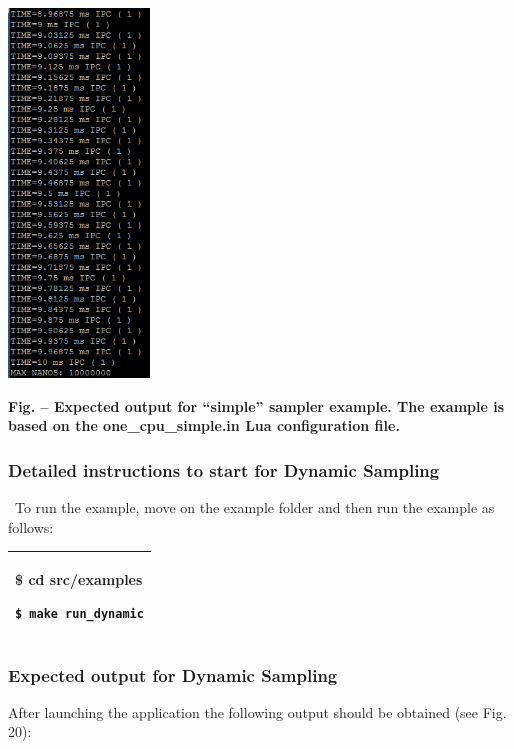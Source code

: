 \documentclass[a4paper]{article}
\newcounter{Figure}
\renewcommand\theFigure{\arabic{Figure}}
\begin{document}
{\centering 
\includegraphics[width=1.4756in,height=3.8563in]{img35.png}
\par}

{\centering{}\sffamily\bfseries
Fig.
\stepcounter{Figure}{\theFigure} -- Expected output for
{\textquotedblleft}simple{\textquotedblright} sampler example. The
example is based on the one\_cpu\_simple.in Lua configuration file.
\par}

\subsubsection[Detailed instructions to start for Dynamic
Sampling]{\textrm{Detailed instructions to
start}\foreignlanguage{english}{\textrm{ for Dynamic Sampling}}}
{
\ To run the example, move on the example folder and then run the
example as follows:}

\begin{flushleft}
\tablehead{}
\begin{supertabular}{|m{6.21846in}|}
\hline
{\ttfamily \$ cd src/examples}

 \texttt{\$ make run\_dynamic}\\\hline
\end{supertabular}
\end{flushleft}
\subsubsection[Expected output for Dynamic Sampling]{\textrm{Expected
output}\foreignlanguage{english}{\textrm{ for Dynamic Sampling}}}
{
After launching the application the following output should be obtained
(see Fig. 20):}
\end{document}
